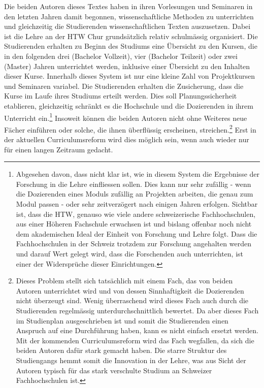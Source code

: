 \documentclass[a4paper,
fontsize=11pt,
oneside,
numbers=noperiodatend,
parskip=half-,
bibliography=totoc,
final
]{scrartcl}
\begin{document}
Die beiden Autoren dieses Textes haben in ihren Vorlesungen und
Seminaren in den letzten Jahren damit begonnen, wissenschaftliche
Methoden zu unterrichten und gleichzeitig die Studierenden
wissenschaftlichen Texten auszusetzen. Dabei ist die Lehre an der HTW
Chur grundsätzlich relativ schulmässig organisiert. Die Studierenden
erhalten zu Beginn des Studiums eine Übersicht zu den Kursen, die in den
folgenden drei (Bachelor Vollzeit), vier (Bachelor Teilzeit) oder zwei
(Master) Jahren unterrichtet werden, inklusive einer Übersicht zu den
Inhalten dieser Kurse. Innerhalb dieses System ist nur eine kleine Zahl
von Projektkursen und Seminaren variabel. Die Studierenden erhalten die
Zusicherung, dass die Kurse im Laufe ihres Studiums erteilt werden. Dies
soll Planungssicherheit etablieren, gleichzeitig schränkt es die
Hochschule und die Dozierenden in ihrem Unterricht ein.\footnote{Abgesehen
  davon, dass nicht klar ist, wie in diesem System die Ergebnisse der
  Forschung in die Lehre einfliessen sollen. Dies kann nur sehr zufällig
  - wenn die Dozierenden eines Moduls zufällig an Projekten arbeiten,
  die genau zum Modul passen - oder sehr zeitverzögert nach einigen
  Jahren erfolgen. Sichtbar ist, dass die HTW, genauso wie viele andere
  schweizerische Fachhochschulen, aus einer Höheren Fachschule erwachsen
  ist und bislang offenbar noch nicht dem akademischen Ideal der Einheit
  von Forschung und Lehre folgt. Dass die Fachhochschulen in der Schweiz
  trotzdem zur Forschung angehalten werden und darauf Wert gelegt wird,
  dass die Forschenden auch unterrichten, ist einer der Widersprüche
  dieser Einrichtungen.} Insoweit können die beiden Autoren nicht ohne
Weiteres neue Fächer einführen oder solche, die ihnen überflüssig
erscheinen, streichen.\footnote{Dieses Problem stellt sich tatsächlich
  mit einem Fach, das von beiden Autoren unterrichtet wird und von
  dessen Sinnhaftigkeit die Dozierenden nicht überzeugt sind. Wenig
  überraschend wird dieses Fach auch durch die Studierenden regelmässig
  unterdurchschnittlich bewertet. Da aber dieses Fach im Studienplan
  ausgeschrieben ist und somit die Studierenden einen Anspruch auf eine
  Durchführung haben, kann es nicht einfach ersetzt werden. Mit der
  kommenden Curriculumsreform wird das Fach wegfallen, da sich die
  beiden Autoren dafür stark gemacht haben. Die starre Struktur des
  Studiengangs hemmt somit die Innovation in der Lehre, was aus Sicht
  der Autoren typisch für das stark verschulte Studium an Schweizer
  Fachhochschulen ist.} Erst in der aktuellen Curriculumsreform wird
dies möglich sein, wenn auch wieder nur für einen langen Zeitraum
gedacht.
\end{document}
